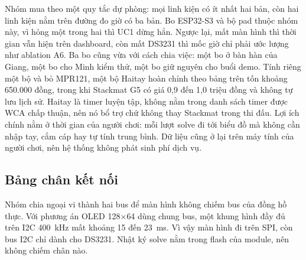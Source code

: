 Nhóm mua theo một quy tắc dự phòng: mọi linh kiện có ít nhất hai bản, còn hai linh kiện nằm trên đường đo giờ có ba bản. Bo ESP32-S3 và bộ pad thuộc nhóm này, vì hỏng một trong hai thì UC1 dừng hẳn. Ngược lại, mất màn hình thì thời gian vẫn hiện trên dashboard, còn mất DS3231 thì mốc giờ chỉ phải ước lượng như ablation A6. Ba bo cũng vừa với cách chia việc: một bo ở bàn hàn của Giang, một bo cho Minh kiểm thử, một bo giữ nguyên cho buổi demo. Tính riêng một bộ và bỏ MPR121, một bộ Haitay hoàn chỉnh theo bảng trên tốn khoảng 650.000 đồng, trong khi Stackmat G5 có giá 0,9 đến 1,0 triệu đồng và không tự lưu lịch sử. Haitay là timer luyện tập, không nằm trong danh sách timer được WCA chấp thuận, nên nó bổ trợ chứ không thay Stackmat trong thi đấu. Lợi ích chính nằm ở thời gian của người chơi: mỗi lượt solve đi tới biểu đồ mà không cần nhập tay, cắm cáp hay tự tính trung bình. Dữ liệu cũng ở lại trên máy tính của người chơi, nên hệ thống không phát sinh phí dịch vụ.

\subsection{Bảng chân kết nối}
Nhóm chia ngoại vi thành hai bus để màn hình không chiếm bus của đồng hồ thực. Với phương án OLED 128$\times$64 dùng chung bus, một khung hình đầy đủ trên I2C 400~kHz mất khoảng 15 đến 23~ms. Vì vậy màn hình đi trên SPI, còn bus I2C chỉ dành cho DS3231. Nhật ký solve nằm trong flash của module, nên không chiếm chân nào.

